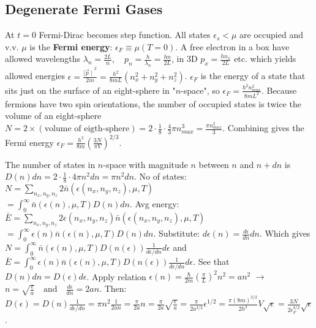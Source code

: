 \documentclass[11pt,twocolumn]{amsart}
\begin{document}
\subsection{Degenerate Fermi Gases}
At $t=0$ Fermi-Dirac becomes step function. All states $\epsilon_s < \mu$ are occupied and v.v. $\mu$ is the \textbf{Fermi energy}: $ \epsilon_{F} \equiv \mu(T=0)$. A free electron in a box have allowed wavelengths $ \lambda_n = \frac{2L}{n}, \quad p_n = \frac{h}{\lambda_n} = \frac{hn}{2L} $, in 3D $ p_x = \frac{hn_x}{2L}$ etc. which yields allowed energies $ \epsilon = \frac{\mid {\vec{p} \mid }^2}{2m} = \frac{h^2}{8mL}(n_x^2 + n_y^2 + n_z^2) $. $\epsilon_F$ is the energy of a state that sits just on the surface of an eight-sphere in "$n$-space", so $ \epsilon_F = \frac{h^2n^2_{max}}{8mL^2} $. Because fermions have two spin orientations, the number of occupied states is twice the volume of an eight-sphere $ N = 2 \times (\text{volume of eigth-sphere}) = 2 \cdot \frac{1}{8} \cdot \frac{4}{3} \pi n^3_{max} = \frac{\pi n^2_{max}}{3} $. Combining gives the Fermi energy $ \epsilon_F = \frac{h^2}{8m} \left( \frac{3N}{\pi V} \right)^{2/3} $.

The number of states in $n$-space with magnitude $n$ between $n$ and $n+dn$ is $ D(n)dn = 2 \cdot \frac{1}{8} \cdot 4 \pi n^2 dn = \pi n^2 dn $. No of states: $ N = \sum_{n_x,n_y,n_z} 2\bar{n}(\epsilon(n_x,n_y,n_z), \mu, T)$\\$= \int_0^{\infty} \bar{n}(\epsilon(n), \mu, T)D(n)dn $. Avg energy:\\ $ \bar{E} = \sum_{n_x,n_y,n_z} 2\epsilon(n_x,n_y,n_z)\bar{n}(\epsilon(n_x,n_y,n_z), \mu, T)$\\$= \int_0^{\infty}\epsilon(n)\bar{n}(\epsilon(n), \mu, T)D(n)dn $. Substitute: $ d\epsilon(n) = \frac{d\epsilon}{dn}dn $. Which gives $ N = \int_0^{\infty} \bar{n}(\epsilon(n), \mu, T)D(n(\epsilon))\frac{1}{d\epsilon / dn} d\epsilon $ and \\$ \bar{E} = \int_0^{\infty}\epsilon(n)\bar{n}(\epsilon(n), \mu, T)D(n(\epsilon))\frac{1}{d\epsilon / dn} d\epsilon$. See that $ D(n)dn = D(\epsilon)d\epsilon $. Apply relation $ \epsilon(n) = \frac{\hbar}{2m}\left( \frac{\pi}{L} \right)^2 n^2 = an^2 $ $\rightarrow$ $ n = \sqrt{\frac{\epsilon}{a}} \quad \text{and} \quad \frac{d\epsilon}{dn} = 2an $. Then: $ D(\epsilon) = D(n)\frac{1}{d\epsilon / dn} = \pi n^2 \frac{1}{2an} = \frac{\pi}{2a}n = \frac{\pi}{2a} \sqrt{\frac{\epsilon}{a}}
        = \frac{\pi}{2a^{3/2}}\epsilon^{1/2} = \frac{\pi(8m)^{3/2}}{2h^3}V\sqrt{\epsilon} = \frac{3N}{2\epsilon_F^{3/2}}\sqrt{\epsilon} $.
\end{document}
